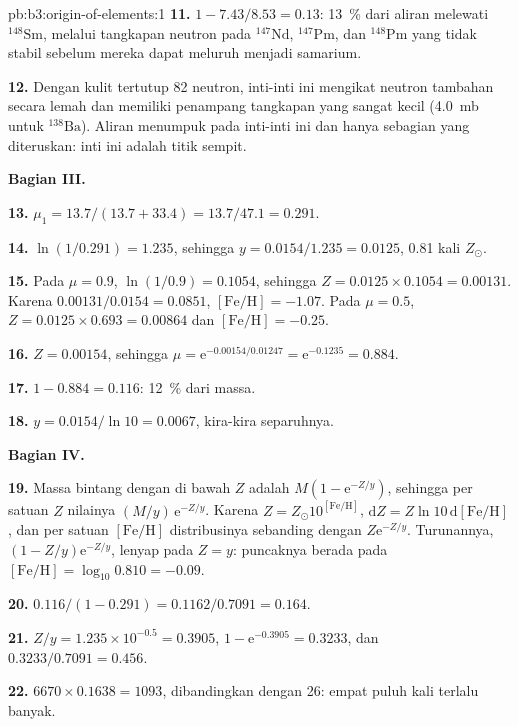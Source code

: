 \begin{solution}{pb:b3:origin-of-elements:1}
\textbf{11.} $1 - 7.43/8.53 = \num{0.13}$: \qty{13}{\percent} dari aliran melewati
$^{148}\mathrm{Sm}$, melalui tangkapan neutron pada
$^{147}\mathrm{Nd}$, $^{147}\mathrm{Pm}$, dan $^{148}\mathrm{Pm}$ yang tidak stabil sebelum
mereka dapat meluruh menjadi samarium.

\textbf{12.} Dengan kulit tertutup 82 neutron, inti-inti ini mengikat neutron tambahan
secara lemah dan memiliki penampang tangkapan yang sangat kecil (\qty{4.0}{mb}
untuk $^{138}\mathrm{Ba}$). Aliran menumpuk pada inti-inti ini dan hanya sebagian yang
diteruskan: inti ini adalah titik sempit.

\textbf{Bagian III.}

\textbf{13.} $\mu_1 = 13.7/(13.7 + 33.4) = 13.7/47.1 = \num{0.291}$.

\textbf{14.} $\ln(1/0.291) = \num{1.235}$, sehingga $y = 0.0154/1.235 = \num{0.0125}$,
\num{0.81} kali $Z_\odot$.

\textbf{15.} Pada $\mu = 0.9$, $\ln(1/0.9) = 0.1054$, sehingga $Z = 0.0125\times0.1054 =
\num{0.00131}$. Karena $0.00131/0.0154 = 0.0851$, $[\mathrm{Fe/H}] =
-1.07$. Pada $\mu = 0.5$, $Z = 0.0125\times0.693 = \num{0.00864}$ dan
$[\mathrm{Fe/H}] = -0.25$.

\textbf{16.} $Z = 0.00154$, sehingga $\mu = \mathrm{e}^{-0.00154/0.01247} =
\mathrm{e}^{-0.1235} = \num{0.884}$.

\textbf{17.} $1 - 0.884 = \num{0.116}$: \qty{12}{\percent} dari massa.

\textbf{18.} $y = 0.0154/\ln 10 = \num{0.0067}$, kira-kira separuhnya.

\textbf{Bagian IV.}

\textbf{19.} Massa bintang dengan  di bawah $Z$ adalah
$M(1 - \mathrm{e}^{-Z/y})$, sehingga per satuan $Z$ nilainya
$(M/y)\,\mathrm{e}^{-Z/y}$. Karena $Z = Z_\odot10^{[\mathrm{Fe/H}]}$,
$\mathrm{d}Z = Z\ln 10\,\mathrm{d}[\mathrm{Fe/H}]$, dan per satuan
$[\mathrm{Fe/H}]$ distribusinya sebanding dengan
$Z\mathrm{e}^{-Z/y}$. Turunannya,
$(1 - Z/y)\mathrm{e}^{-Z/y}$, lenyap pada $Z = y$: puncaknya berada pada
$[\mathrm{Fe/H}] = \log_{10}0.810 = -0.09$.

\textbf{20.} $\num{0.116}/(1 - 0.291) = 0.1162/0.7091 = \num{0.164}$.

\textbf{21.} $Z/y = 1.235\times10^{-0.5} = 0.3905$, $1 - \mathrm{e}^{-0.3905} =
0.3233$, dan $0.3233/0.7091 = \num{0.456}$.

\textbf{22.} $6670\times0.1638 = 1093$, dibandingkan dengan 26: empat puluh kali terlalu banyak.


\end{solution}
